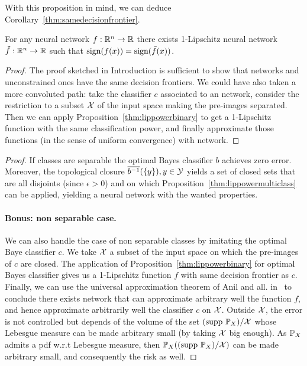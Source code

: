         With this proposition in mind, we can deduce Corollary~\ref{thm:samedecisionfrontier}.
          
        \begin{corollary}\label{thm:samedecisionfrontier}
        For any neural network $f:\mathbb{R}^n\rightarrow\mathbb{R}$ there exists \mbox{1-Lipschitz} neural network $\tilde{f}:\mathbb{R}^n\rightarrow\mathbb{R}$ such that $\text{sign}{(f(x))}=\text{sign}{(\tilde{f}(x))}$.  
        \end{corollary}  
        \begin{proof}  The proof sketched in Introduction is sufficient to show that \LipCl networks and unconstrained ones have the same decision frontiers. We could have also taken a more convoluted path: take the classifier $c$ associated to an \LipInf network, consider the restriction to a subset $\mathcal{X}$ of the input space making the pre-images separated. Then we can apply Proposition~\ref{thm:lippowerbinary} to get a 1-Lipschitz function with the same classification power, and finally approximate those functions (in the sense of uniform convergence) with \LipCl network.  
        \end{proof}
        
        \zeroerror*
          
        \begin{proof}  If classes are separable the optimal Bayes classifier $b$ achieves zero error. Moreover, the topological closure $\overline{b^{-1}}(\{y\}),y\in\mathcal{Y}$ yields a set of closed sets that are all disjoints (since $\epsilon>0$) and on which Proposition~\ref{thm:lippowermulticlass} can be applied, yielding a \LipCl neural network with the wanted properties.  
          
        \paragraph{Bonus: non separable case.} We can also handle the case of non separable classes by imitating the optimal Baye classifier $c$. We take $\mathcal{X}$ a subset of the input space on which the pre-images of $c$ are closed.  The application of Proposition~\ref{thm:lippowerbinary} for optimal Bayes classifier gives us a 1-Lipschitz function $f$ with same decision frontier as $c$. Finally, we can use the universal approximation theorem of Anil and all. in~\cite{anil2019sorting} to conclude there exists \LipCl network that can approximate arbitrary well the function $f$, and hence approximate arbitrarily well the classifier $c$ on $\mathcal{X}$. Outside $\mathcal{X}$, the error is not controlled but depends of the volume of the set $(\text{supp }\mathbb{P}_X)/\mathcal{X}$ whose Lebesgue measure can be made arbitrary small (by taking $\mathcal{X}$ big enough). As $\mathbb{P}_X$ admits a pdf w.r.t Lebesgue measure, then $\mathbb{P}_X((\text{supp }\mathbb{P}_X)/\mathcal{X})$ can be made arbitrary small, and consequently the risk as well.
        \end{proof}
          
